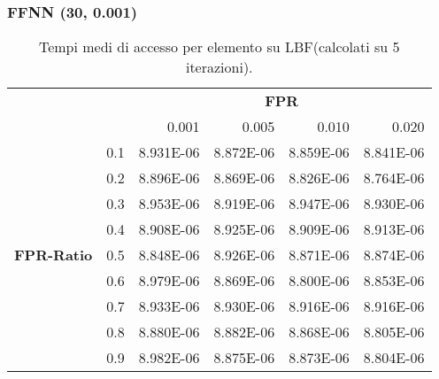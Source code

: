 \documentclass[4apaper,11pt]{report}
\begin{document}
    \subsubsection{FFNN (30, 0.001) }
    \begin{table}[H]
        \centering
        \begin{tabular}{llrrrr}
        \toprule
        {} & & \multicolumn{4}{c}{\textbf{FPR}}\\
        {} & &    0.001 &     0.005 &     0.010 &     0.020 \\
        \midrule
        \multirow{9}{*}{\textbf{FPR-Ratio}} & 0.1& 8.931E-06 & 8.872E-06 & 8.859E-06 & 8.841E-06 \\
        &0.2& 8.896E-06 & 8.869E-06 & 8.826E-06 & 8.764E-06 \\
        &0.3& 8.953E-06 & 8.919E-06 & 8.947E-06 & 8.930E-06 \\
        &0.4& 8.908E-06 & 8.925E-06 & 8.909E-06 & 8.913E-06 \\
        &0.5& 8.848E-06 & 8.926E-06 & 8.871E-06 & 8.874E-06 \\
        &0.6& 8.979E-06 & 8.869E-06 & 8.800E-06 & 8.853E-06 \\
        &0.7& 8.933E-06 & 8.930E-06 & 8.916E-06 & 8.916E-06 \\
        &0.8& 8.880E-06 & 8.882E-06 & 8.868E-06 & 8.805E-06 \\
        &0.9& 8.982E-06 & 8.875E-06 & 8.873E-06 & 8.804E-06 \\
        \bottomrule
        \end{tabular}
        \caption{Tempi medi di accesso per elemento su LBF(calcolati su 5 iterazioni).}
    \end{table}
\end{document}
